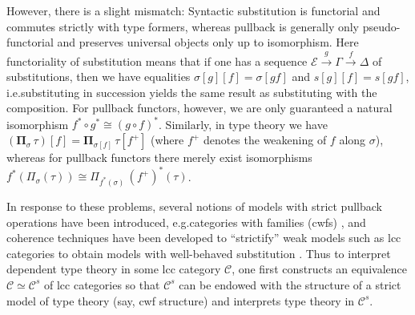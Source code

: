 \documentclass[a4paper]{article}
\theoremstyle{remark}
\theoremstyle{definition}
\begin{document}
However, there is a slight mismatch:
Syntactic substitution is functorial and commutes strictly with type formers, whereas pullback is generally only pseudo-functorial and preserves universal objects only up to isomorphism.
Here functoriality of substitution means that if one has a sequence $\mathcal{E} \xrightarrow{g} \Gamma \xrightarrow{f} \Delta$ of substitutions, then we have equalities $\sigma[g][f] = \sigma[gf]$ and $s[g][f] = s[gf]$, i.e.\@ substituting in succession yields the same result as substituting with the composition.
For pullback functors, however, we are only guaranteed a natural isomorphism $f^* \circ g^* \cong (g \circ f)^*$.
Similarly, in type theory we have $(\mathbf{\Pi}_\sigma \, \tau)[f] = \mathbf{\Pi}_{\sigma[f]} \, \tau[f^+]$ (where $f^+$ denotes the weakening of $f$ along $\sigma$), whereas for pullback functors there merely exist isomorphisms $f^*(\Pi_\sigma(\tau)) \cong \Pi_{f^*(\sigma)} \, (f^+)^*(\tau)$.

In response to these problems, several notions of models with strict pullback operations have been introduced, e.g.\@ categories with families (cwfs) \cite{internal-type-theory}, and coherence techniques have been developed to ``strictify'' weak models such as lcc categories to obtain models with well-behaved substitution \cite{substitution-up-to-isomorphism,on-the-interpretation-of-type-theory-in-lcc-categories,the-local-universes-model}.
Thus to interpret dependent type theory in some lcc category $\mathcal{C}$, one first constructs an equivalence $\mathcal{C} \simeq \mathcal{C}^s$ of lcc categories so that $\mathcal{C}^s$ can be endowed with the structure of a strict model of type theory (say, cwf structure) and interprets type theory in $\mathcal{C}^s$.
\end{document}
